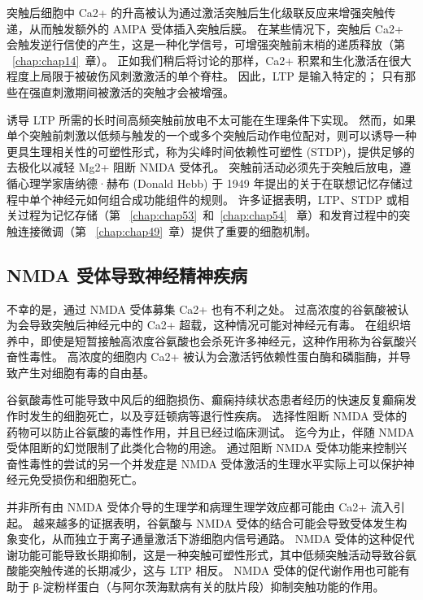 突触后细胞中 Ca2+ 的升高被认为通过激活突触后生化级联反应来增强突触传递，从而触发额外的 AMPA 受体插入突触后膜。
在某些情况下，突触后 Ca2+ 会触发逆行信使的产生，这是一种化学信号，可增强突触前末梢的递质释放（第 ~\ref{chap:chap14}~章）。
正如我们稍后将讨论的那样，Ca2+ 积累和生化激活在很大程度上局限于被破伤风刺激激活的单个脊柱。
因此，LTP 是输入特定的；
只有那些在强直刺激期间被激活的突触才会被增强。


诱导 LTP 所需的长时间高频突触前放电不太可能在生理条件下实现。
然而，如果单个突触前刺激以低频与触发的一个或多个突触后动作电位配对，则可以诱导一种更具生理相关性的可塑性形式，称为尖峰时间依赖性可塑性 (STDP)，提供足够的去极化以减轻 Mg2+ 阻断 NMDA 受体孔。
突触前活动必须先于突触后放电，遵循心理学家唐纳德·赫布 (Donald Hebb) 于 1949 年提出的关于在联想记忆存储过程中单个神经元如何组合成功能组件的规则。 许多证据表明，LTP、STDP 或相关过程为记忆存储（第 ~\ref{chap:chap53}~和~\ref{chap:chap54}~ 章）和发育过程中的突触连接微调（第 ~\ref{chap:chap49}~章）提供了重要的细胞机制。



\subsection{NMDA 受体导致神经精神疾病}

不幸的是，通过 NMDA 受体募集 Ca2+ 也有不利之处。
过高浓度的谷氨酸被认为会导致突触后神经元中的 Ca2+ 超载，这种情况可能对神经元有毒。
在组织培养中，即使是短暂接触高浓度谷氨酸也会杀死许多神经元，这种作用称为谷氨酸兴奋性毒性。
高浓度的细胞内 Ca2+ 被认为会激活钙依赖性蛋白酶和磷脂酶，并导致产生对细胞有毒的自由基。


谷氨酸毒性可能导致中风后的细胞损伤、癫痫持续状态患者经历的快速反复癫痫发作时发生的细胞死亡，以及亨廷顿病等退行性疾病。
选择性阻断 NMDA 受体的药物可以防止谷氨酸的毒性作用，并且已经过临床测试。
迄今为止，伴随 NMDA 受体阻断的幻觉限制了此类化合物的用途。
通过阻断 NMDA 受体功能来控制兴奋性毒性的尝试的另一个并发症是 NMDA 受体激活的生理水平实际上可以保护神经元免受损伤和细胞死亡。


并非所有由 NMDA 受体介导的生理学和病理生理学效应都可能由 Ca2+ 流入引起。
越来越多的证据表明，谷氨酸与 NMDA 受体的结合可能会导致受体发生构象变化，从而独立于离子通量激活下游细胞内信号通路。 
NMDA 受体的这种促代谢功能可能导致长期抑制，这是一种突触可塑性形式，其中低频突触活动导致谷氨酸能突触传递的长期减少，这与 LTP 相反。 
NMDA 受体的促代谢作用也可能有助于 β-淀粉样蛋白（与阿尔茨海默病有关的肽片段）抑制突触功能的作用。


